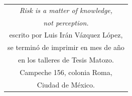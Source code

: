 \documentclass[11pt, oneside]{book}
\begin{document}
\newpage
\thispagestyle{empty}
\begin{table}[p]
\centering
\small
\label{ed}
\begin{tabular}{c}
\textit{Risk is a matter of knowledge,}\\ \textit{not perception.}\\
escrito por Luis Irán Vázquez López,\\ se terminó de imprimir en mes de año\\ en los talleres de Tesis Matozo.\\ Campeche 156, colonia Roma,\\ Ciudad de México.
\end{tabular}
\end{table}


\end{document}
